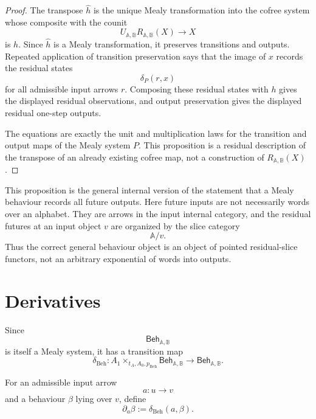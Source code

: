 \begin{proof}
The transpose \(\widehat h\) is the unique Mealy transformation into the
cofree system whose composite with the counit
\[
U_{\mathbb A,\mathbb B}R_{\mathbb A,\mathbb B}(X)\to X
\]
is \(h\). Since \(\widehat h\) is a Mealy transformation, it preserves
transitions and outputs. Repeated application of transition preservation says
that the image of \(x\) records the residual states
\[
\delta_P(r,x)
\]
for all admissible input arrows \(r\). Composing these residual states with
\(h\) gives the displayed residual observations, and output preservation gives
the displayed residual one-step outputs.

The equations are exactly the unit and multiplication laws for the transition
and output maps of the Mealy system \(P\). This proposition is a residual
description of the transpose of an already existing cofree map, not a
construction of \(R_{\mathbb A,\mathbb B}(X)\).
\end{proof}

\begin{remark}
\label{rem:residual-slice-behaviour-meaning}
This proposition is the general internal version of the statement that a
Mealy behaviour records all future outputs. Here future inputs are not
necessarily words over an alphabet. They are arrows in the input internal
category, and the residual futures at an input object \(v\) are organized by
the slice category
\[
\mathbb A/v.
\]
Thus the correct general behaviour object is an object of pointed
residual-slice functors, not an arbitrary exponential of words into outputs.
\end{remark}

\section{Derivatives}
\label{sec:mealy-behaviour-derivatives}

Since
\[
\mathsf{Beh}_{\mathbb A,\mathbb B}
\]
is itself a Mealy system, it has a transition map
\[
\delta_{\mathrm{Beh}}:
A_1\times_{t_A,A_0,p_{\mathrm{Beh}}}
\mathsf{Beh}_{\mathbb A,\mathbb B}
\to
\mathsf{Beh}_{\mathbb A,\mathbb B}.
\]

\begin{definition}[Derivative]
\label{def:behaviour-derivative}
For an admissible input arrow
\[
a:u\to v
\]
and a behaviour \(\beta\) lying over \(v\), define
\[
\partial_a\beta
:=
\delta_{\mathrm{Beh}}(a,\beta).
\]
\end{definition}

